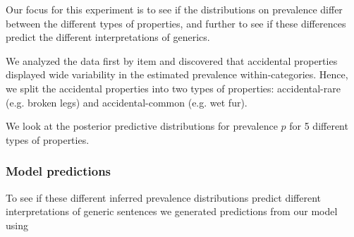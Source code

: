 \documentclass[10pt,letterpaper]{article}
\begin{document}
Our focus for this experiment is to see if the distributions on prevalence differ between the different types of properties, and further to see if these differences predict the different interpretations of generics. 

We analyzed the data first by item and discovered that accidental properties displayed wide variability in the estimated prevalence within-categories. Hence, we split the accidental properties into two types of properties: accidental-rare (e.g. broken legs) and accidental-common (e.g. wet fur).

We look at the posterior predictive distributions for prevalence $p$ for 5 different types of properties. 

\subsubsection{Model predictions}
\label{sec:modelAsymmetry}

To see if these different inferred prevalence distributions predict different interpretations of generic sentences we generated predictions from our model using 

%
%
%
%
%
%
\end{document}
